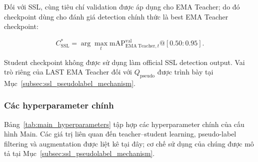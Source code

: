 \documentclass[pdflatex,sn-mathphys-num]{sn-jnl}%
\theoremstyle{thmstyleone}%
\theoremstyle{thmstyletwo}%
\theoremstyle{thmstylethree}%
\begin{document}
Đối với SSL, cùng tiêu chí validation được áp dụng cho EMA Teacher; do đó
checkpoint dùng cho đánh giá detection chính thức là best EMA Teacher
checkpoint:

\begin{equation}
C_{\mathrm{SSL}}^{*}
=
\arg\max_t
\mathrm{mAP}^{\mathrm{val}}_{\mathrm{EMA\ Teacher},t}@[0.50:0.95].
\label{eq:ssl_best_teacher_checkpoint}
\end{equation}

Student checkpoint không được sử dụng làm official SSL detection output.
Vai trò riêng của LAST EMA Teacher đối với
\(Q_{\mathrm{pseudo}}\) được trình bày tại
Mục~\ref{subsec:ssl_pseudolabel_mechanism}.

\subsubsection{Các hyperparameter chính}
\label{subsubsec:main_hyperparameters}

Bảng~\ref{tab:main_hyperparameters} tập hợp các hyperparameter chính của
cấu hình Main. Các giá trị liên quan đến teacher--student learning,
pseudo-label filtering và augmentation được liệt kê tại đây; cơ chế sử dụng của chúng được mô tả tại
Mục~\ref{subsec:ssl_pseudolabel_mechanism}.

\begingroup
\small
\setlength{\tabcolsep}{2.5pt}
\renewcommand{\arraystretch}{1.08}
\end{document}
